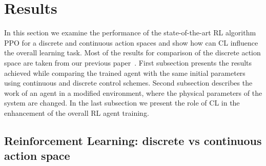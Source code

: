 \section{Results}

In this section we examine the performance of the state-of-the-art RL algorithm PPO for a discrete and continuous action spaces and show how can CL influence the overall learning task. Most of the results for comparison of the discrete action space are taken from our previous paper~\cite{manzl2023relrl}. First subsection presents the results achieved while comparing the trained agent with the same initial parameters using continuous and discrete control schemes. Second subsection describes the work of an agent in a modified environment, where the physical parameters of the system are changed. In the last subsection we present the role of CL in the enhancement of the overall RL agent training. 

\subsection{Reinforcement Learning: discrete vs continuous action space} \label{Reinforcement Learning: discrete vs continuous action space}

